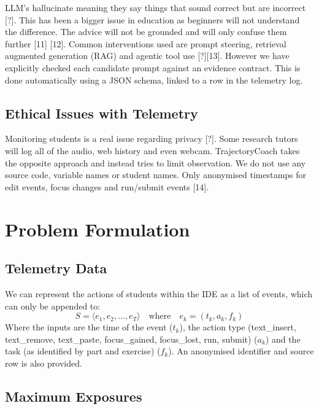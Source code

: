 \documentclass[conference]{IEEEtran}
\begin{document}
LLM's hallucinate meaning they say things that sound correct but are incorrect [?]. This has been a bigger issue in education as beginners will not understand the difference. The advice will not be grounded and will only confuse them further [11] [12]. Common interventions used are prompt steering, retrieval augmented generation (RAG) and agentic tool use [?][13]. However we have explicitly checked each candidate prompt against an evidence contract. This is done automatically using a JSON schema, linked to a row in the telemetry log.

\subsection{Ethical Issues with Telemetry}

Monitoring students is a real issue regarding privacy [?]. Some research tutors will log all of the audio, web history and even webcam. TrajectoryCoach takes the opposite approach and instead tries to limit observation. We do not use any source code, variable names or student names. Only anonymised timestamps for edit events, focus changes and run/submit events [14].

\section{Problem Formulation}

\subsection{Telemetry Data}

We can represent the actions of students within the IDE as a list of events, which can only be appended to:
\begin{equation}
S = \langle e_1, e_2,\ldots, e_T\rangle \quad \text{where} \quad e_k = (t_k, a_k, f_k)
\end{equation}
Where the inputs are the time of the event ($t_k$), the action type (text\_insert, text\_remove, text\_paste, focus\_gained, focus\_lost, run, submit) ($a_k$) and the task (as identified by part and exercise) ($f_k$). An anonymised identifier and source row is also provided.

\subsection{Maximum Exposures}
\end{document}
